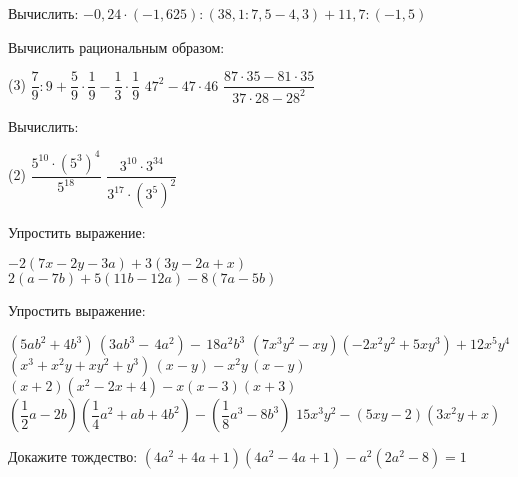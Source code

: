 \begin{class}[number=3]
	\begin{listofex}
	\item Вычислить: \( -0,24\cdot(-1,625):(38,1:7,5-4,3)+11,7:(-1,5) \)
	\item Вычислить рациональным образом:
	\begin{tasks}(3)
		\task \( \dfrac{7}{9}:9+\dfrac{5}{9}\cdot\dfrac{1}{9}-\dfrac{1}{3}\cdot\dfrac{1}{9} \)
		\task \( 47^2-47\cdot46 \)
		\task \( \dfrac{87\cdot35-81\cdot35}{37\cdot28-28^2} \)
	\end{tasks}
	\item Вычислить:
	\begin{tasks}(2)
		\task \( \dfrac{5^{10}\cdot(5^3)^4}{5^{18}} \)
		\task \( \dfrac{3^{10}\cdot3^{34}}{3^{17}\cdot{(3^5)^2}} \)
	\end{tasks}
	\item Упростить выражение:
	\begin{tasks}
		\task \( -2(7x-2y-3a)+3(3y-2a+x) \)
		\task \( 2(a-7b)+5(11b-12a)-8(7a-5b) \)
	\end{tasks}
	\item Упростить выражение:
	\begin{tasks}
		\task \( (5a b^{2}+4b^{3})\,(3a b^{3}-\,4a^{2})-\,18a^{2}b^{3} \)
		\task \( (7x^{3}y^{2}-x y)(-2x^{2}y^{2}+5x y^{3})+12x^{5}y^{4} \)
		\task \( (x^{3}+x^{2}y+x y^{2}+y^{3})\,(x-y)-x^{2}y\,(x-y) \)
		\task \( (x+2)(x^{2}-2x+4)-x(x-3)(x+3) \)
		\task \( \left( \dfrac{1}{2}a-2b \right)\left( \dfrac{1}{4}a^2+ab+4b^2 \right)-\left( \dfrac{1}{8}a^3-8b^3 \right) \)
		\task \( 15x^3y^2-(5xy-2)(3x^2y+x) \)
	\end{tasks}
	\item Докажите тождество: \( (4a^2+4a+1)(4a^2-4a+1)-a^2(2a^2-8)=1 \)
	\end{listofex}
\end{class}

